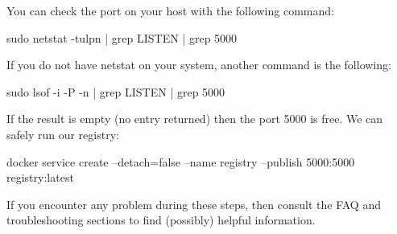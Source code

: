 You can check the port on your host with the following command:

sudo netstat -tulpn | grep LISTEN | grep 5000

If you do not have netstat on your system, another command is the following:

sudo lsof -i -P -n | grep LISTEN | grep 5000

If the result is empty (no entry returned) then the port 5000 is free.
We can safely run our registry:

docker service create --detach=false --name registry --publish 5000:5000 registry:latest

If you encounter any problem during these steps, then
consult the FAQ and troubleshooting sections to find (possibly)
helpful information.